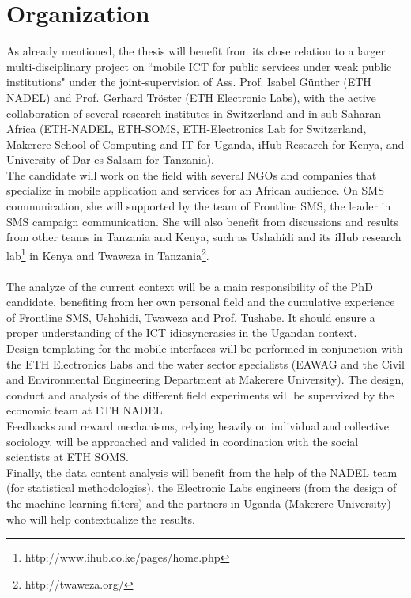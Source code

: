 \documentclass[11pt]{article}
\begin{document}
\section{Organization}\label{organization}
As already mentioned, the thesis will benefit from its close relation to a larger multi-disciplinary project on ``mobile ICT for public services under weak public institutions" under the joint-supervision of Ass. Prof. Isabel Günther (ETH NADEL) and Prof. Gerhard Tr\"{o}ster (ETH Electronic Labs), with the active collaboration of several research institutes in Switzerland and in sub-Saharan Africa (ETH-­NADEL, ETH-­SOMS, ETH-­Electronics Lab for Switzerland, Makerere School of Computing and IT for Uganda, iHub Research for Kenya, and University of Dar es Salaam for Tanzania).  
\\
The candidate will work on the field with several NGOs and companies that specialize in mobile application and services for an African audience. On SMS communication, she will supported by the team of Frontline SMS, the leader in SMS campaign communication. She will also benefit from discussions and results from other teams in Tanzania and Kenya, such as Ushahidi and its iHub research lab\footnote{http://www.ihub.co.ke/pages/home.php} in Kenya and Twaweza in Tanzania\footnote{http://twaweza.org/}.
\\\\
The analyze of the current context will be a main responsibility of the PhD candidate, benefiting from her own personal field and the cumulative experience of Frontline SMS, Ushahidi, Twaweza and Prof. Tushabe. It should ensure a proper understanding of the ICT idiosyncrasies in the Ugandan context.
\\
Design templating for the mobile interfaces will be performed in conjunction with the ETH Electronics Labs and the water sector specialists (EAWAG and the Civil and Environmental Engineering Department at Makerere University). The design, conduct and analysis of the different field experiments will be supervized by the economic team at ETH NADEL.
\\
Feedbacks and reward mechanisms, relying heavily on individual and collective sociology, will be approached and valided in coordination with the social scientists at ETH SOMS.
\\
Finally, the data content analysis will benefit from the help of the NADEL team (for statistical methodologies), the Electronic Labs engineers (from the design of the machine learning filters) and the partners in Uganda (Makerere University) who will help contextualize the results.    
\end{document}
